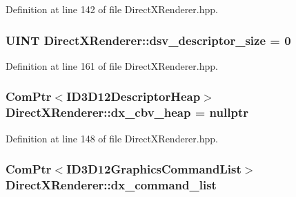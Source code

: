 Definition at line 142 of file Direct\+X\+Renderer.\+hpp.

\subsubsection[{\texorpdfstring{dsv\+\_\+descriptor\+\_\+size}{dsv_descriptor_size}}]{\setlength{\rightskip}{0pt plus 5cm}U\+I\+NT Direct\+X\+Renderer\+::dsv\+\_\+descriptor\+\_\+size = 0\hspace{0.3cm}{\ttfamily [protected]}}\hypertarget{class_direct_x_renderer_a0b16f02604e3f5cf4e55321d01e4bd9d_a0b16f02604e3f5cf4e55321d01e4bd9d}{}\label{class_direct_x_renderer_a0b16f02604e3f5cf4e55321d01e4bd9d_a0b16f02604e3f5cf4e55321d01e4bd9d}


Definition at line 161 of file Direct\+X\+Renderer.\+hpp.

\subsubsection[{\texorpdfstring{dx\+\_\+cbv\+\_\+heap}{dx_cbv_heap}}]{\setlength{\rightskip}{0pt plus 5cm}Com\+Ptr$<$I\+D3\+D12\+Descriptor\+Heap$>$ Direct\+X\+Renderer\+::dx\+\_\+cbv\+\_\+heap = nullptr\hspace{0.3cm}{\ttfamily [protected]}}\hypertarget{class_direct_x_renderer_a2aaa7a57aea5c65a3381e54513ed7ff2_a2aaa7a57aea5c65a3381e54513ed7ff2}{}\label{class_direct_x_renderer_a2aaa7a57aea5c65a3381e54513ed7ff2_a2aaa7a57aea5c65a3381e54513ed7ff2}


Definition at line 148 of file Direct\+X\+Renderer.\+hpp.

\subsubsection[{\texorpdfstring{dx\+\_\+command\+\_\+list}{dx_command_list}}]{\setlength{\rightskip}{0pt plus 5cm}Com\+Ptr$<$I\+D3\+D12\+Graphics\+Command\+List$>$ Direct\+X\+Renderer\+::dx\+\_\+command\+\_\+list\hspace{0.3cm}{\ttfamily [protected]}}\hypertarget{class_direct_x_renderer_a5bdea06c9f3fa2af49413a70f39bc0fb_a5bdea06c9f3fa2af49413a70f39bc0fb}{}\label{class_direct_x_renderer_a5bdea06c9f3fa2af49413a70f39bc0fb_a5bdea06c9f3fa2af49413a70f39bc0fb}


